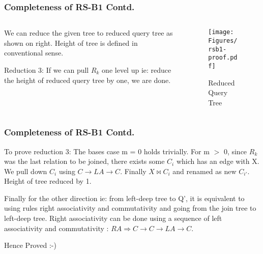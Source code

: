 \documentclass{beamer}
\begin{document}
  \begin{frame}
  \frametitle{Completeness of RS-B1 Contd.}
\begin{minipage}{\textwidth}
\begin{columns}[T]
\begin{column}{0.55\textwidth}
We can reduce the given tree to reduced query tree as shown on right. Height of tree is defined in conventional sense. \vspace{\baselineskip}

Reduction 3: If we can pull $R_k$ one level up ie: reduce the height of reduced query tree by one, we are done. \vspace{\baselineskip}
\end{column}
\begin{column}{0.45\textwidth}
\begin{figure}[here]
\begin{center}
\texttt{[image: Figures/rsb1-proof.pdf]}
\end{center}
\caption{Reduced Query Tree}
\label{fig:rsb1-proof}
\end{figure} 
\end{column}
\end{columns}
\end{minipage}

  \end{frame}

  \begin{frame}
  \frametitle{Completeness of RS-B1 Contd.}
  To prove reduction 3: The bases case m = 0 holds trivially. For m $>$ 0, since $R_{k}$ was the last relation to be joined, there exists some $C_i$ which has an edge with X. We pull down $C_i$ using  $C \rightarrow LA \rightarrow C$. Finally $X \bowtie C_i$ and renamed as new $C_{i'}$. Height of tree reduced by 1. \vspace{\baselineskip}
  
  Finally for the other direction ie: from left-deep tree to Q', it is equivalent to using rules right associativity and commutativity and going from the join tree to left-deep tree. Right associativity can be done using a sequence of left associativity and commutativity : $RA \Rightarrow C \rightarrow C \rightarrow LA \rightarrow C$. \vspace{\baselineskip}
  
  Hence Proved :-)
  \end{frame}
  
\end{document}
